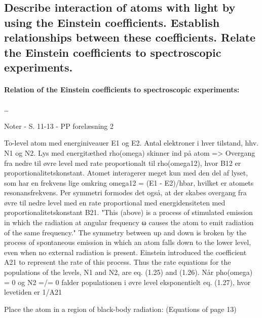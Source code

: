 \subsection{Describe interaction of atoms with light by using the Einstein coefficients. Establish relationships between these coefficients. Relate the Einstein coefficients to spectroscopic experiments.}





\paragraph{Relation of the Einstein coefficients to spectroscopic experiments:} \ldots




Noter
- S. 11-13
- PP forelæsning 2

To-level atom med energiniveauer E1 og E2. Antal elektroner i hver tilstand, hhv. N1 og N2.
Lys med energitæthed rho(omega) skinner ind på atom => Overgang fra nedre til øvre level med rate proportionalt til rho(omega12), hvor B12 er proportionalitetskonstant. Atomet interagerer meget kun med den del af lyset, som har en frekvens lige omkring omega12 = (E1 - E2)/hbar, hvilket er atomets resonansfrekvens.
Per symmetri formodes det også, at der skabes overgang fra øvre til nedre level med en rate proportional med energidensiteten med proportionalitetskonstant B21.
"This (above) is a process of stimulated emission in which the radiation
at angular frequency ω causes the atom to emit radiation of the same
frequency."
The symmetry between up and down is broken by the process of spontaneous emission in which an atom falls down to the lower level, even when no external radiation is present. Einstein introduced the coefficient A21 to represent the rate of this process. Thus the rate equations for the populations of the levels, N1 and N2, are eq. (1.25) and (1.26).
Når pho(omega) = 0 og N2 =/= 0 falder populationen i øvre level eksponentielt eq. (1.27), hvor levetiden er 1/A21

Place the atom in a region of black-body radiation: (Equations of page 13)